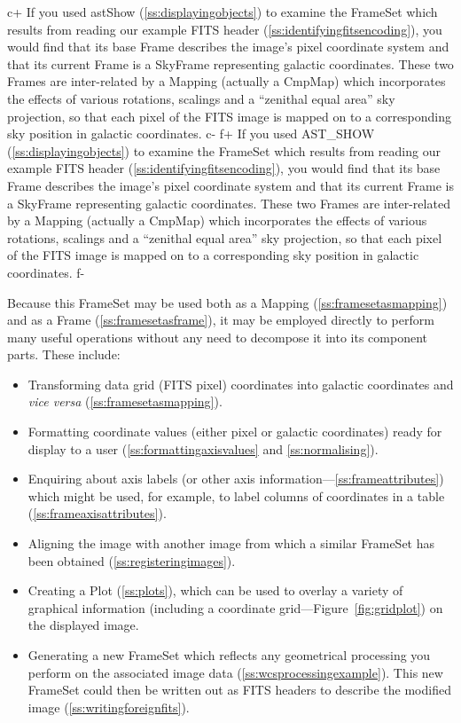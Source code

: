 \documentclass[twoside,11pt]{article}
\newcommand{\secref}[1]{\S\ref{#1}}
\renewcommand{\secref}[1]{\ref{#1}}
\begin{document}
c+
If you used astShow (\secref{ss:displayingobjects}) to examine the
FrameSet which results from reading our example FITS header
(\secref{ss:identifyingfitsencoding}), you would find that its base
Frame describes the image's pixel coordinate system and that its
current Frame is a SkyFrame representing galactic coordinates. These
two Frames are inter-related by a Mapping (actually a CmpMap) which
incorporates the effects of various rotations, scalings and a
``zenithal equal area'' sky projection, so that each pixel of the FITS
image is mapped on to a corresponding sky position in galactic
coordinates.
c-
f+
If you used AST\_SHOW (\secref{ss:displayingobjects}) to examine the
FrameSet which results from reading our example FITS header
(\secref{ss:identifyingfitsencoding}), you would find that its base
Frame describes the image's pixel coordinate system and that its
current Frame is a SkyFrame representing galactic coordinates. These
two Frames are inter-related by a Mapping (actually a CmpMap) which
incorporates the effects of various rotations, scalings and a
``zenithal equal area'' sky projection, so that each pixel of the FITS
image is mapped on to a corresponding sky position in galactic
coordinates.
f-

Because this FrameSet may be used both as a Mapping
(\secref{ss:framesetasmapping}) and as a Frame
(\secref{ss:framesetasframe}), it may be employed directly to perform
many useful operations without any need to decompose it into its
component parts. These include:

\begin{itemize}
\item Transforming data grid (FITS pixel) coordinates into galactic
coordinates and {\em{vice versa}} (\secref{ss:framesetasmapping}).

\item Formatting coordinate values (either pixel or galactic
coordinates) ready for display to a user
(\secref{ss:formattingaxisvalues} and \secref{ss:normalising}).

\item Enquiring about axis labels (or other axis
information---\secref{ss:frameattributes}) which might be used, for
example, to label columns of coordinates in a table
(\secref{ss:frameaxisattributes}).

\item Aligning the image with another image from which a similar
FrameSet has been obtained (\secref{ss:registeringimages}).

\item Creating a Plot (\secref{ss:plots}), which can be used to overlay
a variety of graphical information (including a coordinate
grid---Figure~\ref{fig:gridplot}) on the displayed image.

\item Generating a new FrameSet which reflects any geometrical
processing you perform on the associated image data
(\secref{ss:wcsprocessingexample}). This new FrameSet could then be
written out as FITS headers to describe the modified image
(\secref{ss:writingforeignfits}).
\end{itemize}
\end{document}
